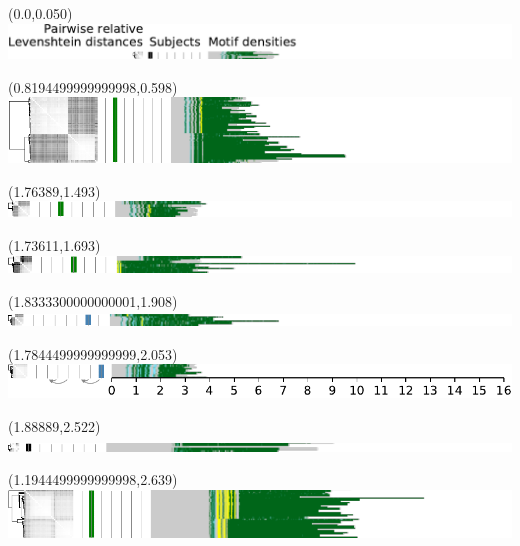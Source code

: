 \documentclass{article}
\begin{document}
\begin{textblock}{13}(0.0,0.050)\includegraphics{./Figure_S5/chr7-HG001.pdf}\end{textblock}
\begin{textblock}{13}(0.8194499999999998,0.598)\includegraphics{./Figure_S5/chr7-HG002.pdf}\end{textblock}
\begin{textblock}{13}(1.76389,1.493)\includegraphics{./Figure_S5/chr7-HG003.pdf}\end{textblock}
\begin{textblock}{13}(1.73611,1.693)\includegraphics{./Figure_S5/chr7-HG004.pdf}\end{textblock}
\begin{textblock}{13}(1.8333300000000001,1.908)\includegraphics{./Figure_S5/chr7-HG006.pdf}\end{textblock}
\begin{textblock}{13}(1.7844499999999999,2.053)\includegraphics{./Figure_S5/chr7-HG007.pdf}\end{textblock}
\begin{textblock}{13}(1.88889,2.522)\includegraphics{./Figure_S5/chr8-HG001.pdf}\end{textblock}
\begin{textblock}{13}(1.1944499999999998,2.639)\includegraphics{./Figure_S5/chr8-HG002.pdf}\end{textblock}
\end{document}
